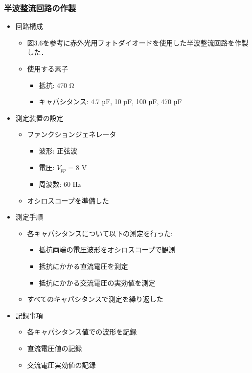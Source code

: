 \documentclass{ltjsarticle}
\begin{document}
\subsubsection{半波整流回路の作製}
\begin{itemize}
  \item 回路構成
  \begin{itemize}
    \item 図3.6を参考に赤外光用フォトダイオードを使用した半波整流回路を作製した．
    \item 使用する素子
      \begin{itemize}
        \item 抵抗: 470 Ω
        \item キャパシタンス: 4.7 µF, 10 µF, 100 µF, 470 µF
      \end{itemize}
  \end{itemize}
  \item 測定装置の設定
  \begin{itemize}
    \item ファンクションジェネレータ
      \begin{itemize}
        \item 波形: 正弦波
        \item 電圧: $V_{pp}$ = 8 V
        \item 周波数: 60 Hz
      \end{itemize}
    \item オシロスコープを準備した
  \end{itemize}
  \item 測定手順
  \begin{itemize}
    \item 各キャパシタンスについて以下の測定を行った:
      \begin{itemize}
        \item 抵抗両端の電圧波形をオシロスコープで観測
        \item 抵抗にかかる直流電圧を測定
        \item 抵抗にかかる交流電圧の実効値を測定
      \end{itemize}
    \item すべてのキャパシタンスで測定を繰り返した
  \end{itemize}
  \item 記録事項
  \begin{itemize}
    \item 各キャパシタンス値での波形を記録
    \item 直流電圧値の記録
    \item 交流電圧実効値の記録
  \end{itemize}
\end{itemize}
\end{document}
